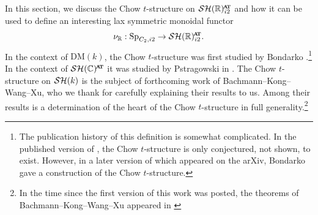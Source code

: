 In this section, we discuss the Chow $t$-structure on $\SHRat$ and how it can be used to define an interesting lax symmetric monoidal functor
\[\nur : \Sp_{C_2,i2} \to \SHRat.\]
In the context of $\mathrm{DM}(k)$, the Chow $t$-structure was first studied by Bondarko \cite{Bondarko}.\footnote{The publication history of this definition is somewhat complicated. In the published version of \cite{Bondarko}, the Chow $t$-structure is only conjectured, not shown, to exist. However, in a later version of \cite{Bondarko} which appeared on the arXiv, Bondarko gave a construction of the Chow $t$-structure.}
In the context of $\SHC^{\at}$ it was studied by Pstragowski in \cite{Pstragowski}.
The Chow $t$-structure on $\mathcal{SH}(k)$ is the subject of forthcoming work of Bachmann--Kong--Wang--Xu, who we thank for carefully explaining their results to us. Among their results is a determination of the heart of the Chow $t$-structure in full generality.\footnote{In the time since the first version of this work was posted, the theorems of Bachmann--Kong--Wang--Xu appeared in \cite{Chow}}




